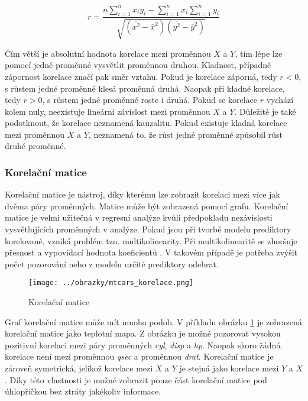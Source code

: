 \begin{equation}
r = \frac{n \sum_{i=1}^n x_i y_i - \sum_{i=1}^n x_i \sum_{i=1}^n y_i}
{\sqrt{(\overline{x^2} - \overline{x}^2)(\overline{y^2} - \overline{y}^2)}}
\end{equation}

Čím větší je absolutní hodnota korelace mezi proměnnou $X$ a $Y$, tím lépe lze pomocí jedné proměnné vysvětlit proměnnou druhou. Kladnost, případně zápornost korelace
značí pak směr vztahu. Pokud je korelace záporná, tedy $r < 0$, s růstem jedné proměnné klesá proměnná druhá. Naopak při kladné korelace, tedy $r > 0$, s růstem
jedné proměnné roste i druhá.
{\color{red}
Pokud se korelace $r$ vychází kolem nuly, neexistuje lineární závislost mezi proměnnou $X$ a $Y$. Důležité je také podotknout, že korelace neznamená kauzalitu. Pokud
existuje kladná korelace mezi proměnnou $X$ a $Y$, neznamená to, že růst jedné proměnné způsobil růst druhé proměnné.  
}

\subsubsection{Korelační matice}
Korelační matice je nástroj, díky kterému lze zobrazit korelaci mezi více jak dvěma páry proměnných. Matice může být zobrazená
{\color{red}
pomocí grafu.
}
Korelační matice je velmi užitečná v regresní analýze kvůli předpokladu nezávislosti
{\color{red}
vysvětlujících proměnných v analýze.
}
Pokud jsou při tvorbě modelu prediktory korelované,
vzniká problém tzn. multikolinearity. Při multikolinearitě se zhoršuje přesnost a vypovídací hodnota koeficientů \cite{Kleinbaum2010}.
V takovém případě je potřeba zvýšit počet pozorování nebo z modelu určité prediktory odebrat. 

\begin{figure}[H]
    \centering
    \texttt{[image: ../obrazky/mtcars\_korelace.png]}
    \caption{Korelační matice} 
    \label{fig:mtcars_korelace}
\end{figure}

Graf korelační matice může mít mnoho podob. V příkladu obrázku \ref{fig:mtcars_korelace} je zobrazená korelační matice jako teplotní mapa. Z obrázku je možné pozorovat vysokou
pozitivní korelaci mezi páry proměnných \textit{cyl}, \textit{disp} a \textit{hp}. Naopak skoro žádná korelace není mezi proměnnou \textit{qsec} a proměnnou \textit{drat}.
Korelační matice je zároveň symetrická, jelikož korelace mezi $X$ a $Y$ je stejná jako korelace mezi $Y$ a $X$. Díky této vlastnosti je možné zobrazit pouze část 
korelační matice pod úhlopříčkou bez ztráty jakékoliv informace.


